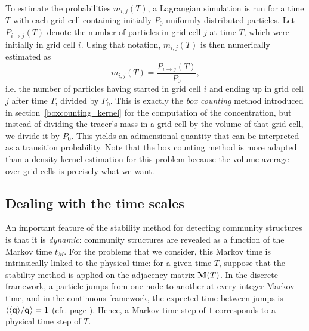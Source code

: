 To estimate the probabilities $m_{i,j}(T)$, a Lagrangian simulation is run for a time $T$ with each grid cell containing initially $P_0$ uniformly distributed particles. Let $P_{i \rightarrow j}(T)$ denote the number of particles in grid cell $j$ at time $T$, which were initially in grid cell $i$. Using that notation, $m_{i,j}(T)$ is then numerically estimated as 
\begin{equation}
	m_{i,j}(T) = \frac{P_{i \rightarrow j}(T)}{P_0},
\end{equation}
i.e. the number of particles having started in grid cell $i$ and ending up in grid cell $j$ after time $T$, divided by $P_0$. This is exactly the \textit{box counting} method introduced in section~\ref{boxcounting_kernel} for the computation of the concentration, but instead of dividing the tracer's mass in a grid cell by the volume of that grid cell, we divide it by $P_0$. This yields an adimensional quantity that can be interpreted as a transition probability. Note that the box counting method is more adapted than a density kernel estimation for this problem because the volume average over grid cells is precisely what we want.

\subsection{Dealing with the time scales}
An important feature of the stability method for detecting community structures is that it is \textit{dynamic}: community structures are revealed as a function of the Markov time $t_M$. For the problems that we consider, this Markov time is intrinsically linked to the physical time: for a given time $T$, suppose that the stability method is applied on the adjacency matrix $\mathbf M(T)$. In the discrete framework, a particle jumps from one node to another at every integer Markov time, and in the continuous framework, the expected time between jumps is $\langle \langle \mathbf q \rangle/\mathbf q \rangle = 1$ (cfr. page \pageref{expectedtimebetweenjumps}). Hence, a Markov time step of $1$ corresponds to a physical time step of $T$.

